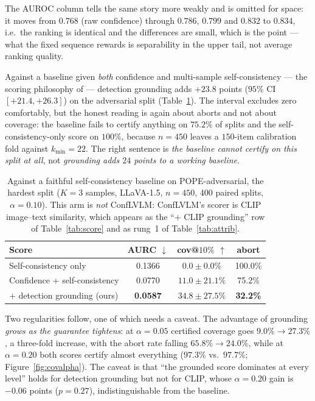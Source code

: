 \documentclass{article}
\theoremstyle{plain}
\theoremstyle{definition}
\theoremstyle{remark}
\begin{document}
The AUROC column tells the same story more weakly and is omitted for space: it moves from
$0.768$ (raw confidence) through $0.786$, $0.799$ and $0.832$ to $0.834$, i.e.\ the ranking is
identical and the differences are small, which is the point --- what the fixed sequence rewards
is separability in the upper tail, not average ranking quality.

Against a baseline given \emph{both} confidence and multi-sample self-consistency --- the
scoring philosophy of \citet{conflvlm} --- detection grounding adds $+23.8$ points
($95\%$ CI $[+21.4,+26.3]$) on the adversarial split (Table~\ref{tab:selfcons}). The interval
excludes zero comfortably, but the honest reading is again about aborts and not about coverage:
the baseline fails to certify anything on $75.2\%$ of splits and the self-consistency-only score
on $100\%$, because $n=450$ leaves a $150$-item calibration fold against $k_{\min}=22$. The
right sentence is \emph{the baseline cannot certify on this split at all}, not \emph{grounding
adds $24$ points to a working baseline}.

\begin{table}[t]
\centering
\caption{Against a faithful self-consistency baseline on POPE-adversarial, the hardest
split ($K=3$ samples, LLaVA-1.5, $n=450$, $400$ paired splits, $\alpha=0.10$). This arm is
\emph{not} ConfLVLM: ConfLVLM's scorer is CLIP image--text similarity, which appears as the
``$+$ CLIP grounding'' row of Table~\ref{tab:score} and as rung~1 of Table~\ref{tab:attrib}.}
\label{tab:selfcons}
\small
\begin{tabular}{lccc}
\toprule
Score & AURC $\downarrow$ & cov@$10\%$ $\uparrow$ & abort\\
\midrule
Self-consistency only & 0.1366 & $0.0\pm0.0\%$ & 100.0\%\\
Confidence $+$ self-consistency & 0.0770 & $11.0\pm21.1\%$ & \phantom{0}75.2\%\\
\quad $+$ detection grounding (ours) & \textbf{0.0587} & $\mathbf{34.8\pm27.5\%}$ & \phantom{0}\textbf{32.2\%}\\
\bottomrule
\end{tabular}
\end{table}

Two regularities follow, one of which needs a caveat. The advantage of grounding \emph{grows as
the guarantee tightens}: at $\alpha=0.05$ certified coverage goes $9.0\%\to27.3\%$, a
three-fold increase, with the abort rate falling $65.8\%\to24.0\%$, while at $\alpha=0.20$ both
scores certify almost everything ($97.3\%$ vs.\ $97.7\%$; Figure~\ref{fig:covalpha}). The
caveat is that ``the grounded score dominates at every level'' holds for detection grounding but
not for CLIP, whose $\alpha=0.20$ gain is $-0.06$ points ($p=0.27$), indistinguishable from the
baseline.
\end{document}
